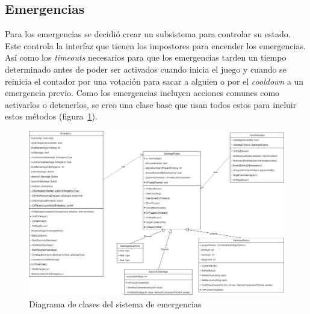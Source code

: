 \subsection{Emergencias}
Para los emergencias se decidió crear un subsistema para controlar su estado. Este controla la interfaz que tienen los impostores para encender los emergencias. Así como los \textit{timeouts} necesarios para que los emergencias tarden un tiempo determinado antes de poder ser activados cuando inicia el juego y cuando se reinicia el contador por una votación para sacar a alguien o por el \textit{cooldown} a un emergencia previo.
Como los emergencias incluyen acciones comunes como activarlos o detenerlos, se creo una clase base que usan todos estos para incluir estos métodos (figura~\ref{fig:diagrama_clases_emergencias}).
\begin{figure}[h]
    \centering
    \includegraphics[width=1\linewidth]{images/DiagramaClasesEmergencias.png}
    \caption{Diagrama de clases del sistema de emergencias}
    \label{fig:diagrama_clases_emergencias}
\end{figure}
